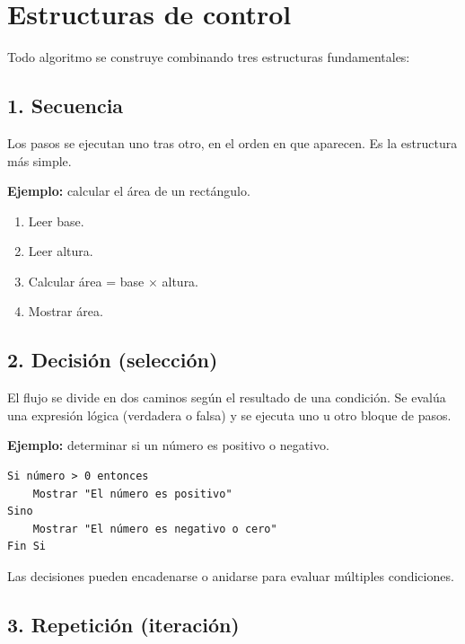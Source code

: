 \section{Estructuras de control}

Todo algoritmo se construye combinando tres estructuras fundamentales:

\subsection{1. Secuencia}

Los pasos se ejecutan uno tras otro, en el orden en que aparecen. Es la estructura más simple.


\textbf{Ejemplo:} calcular el área de un rectángulo.
\begin{enumerate}
    \item Leer base.
    \item Leer altura.
    \item Calcular área = base $\times$ altura.
    \item Mostrar área.
\end{enumerate}

\subsection{2. Decisión (selección)}

El flujo se divide en dos caminos según el resultado de una condición. Se evalúa una expresión lógica (verdadera o falsa) y se ejecuta uno u otro bloque de pasos.


\textbf{Ejemplo:} determinar si un número es positivo o negativo.

\begin{lstlisting}[style=estilo-pseudocode]
Si número > 0 entonces
    Mostrar "El número es positivo"
Sino
    Mostrar "El número es negativo o cero"
Fin Si
\end{lstlisting}

Las decisiones pueden encadenarse o anidarse para evaluar múltiples condiciones.

\subsection{3. Repetición (iteración)}

